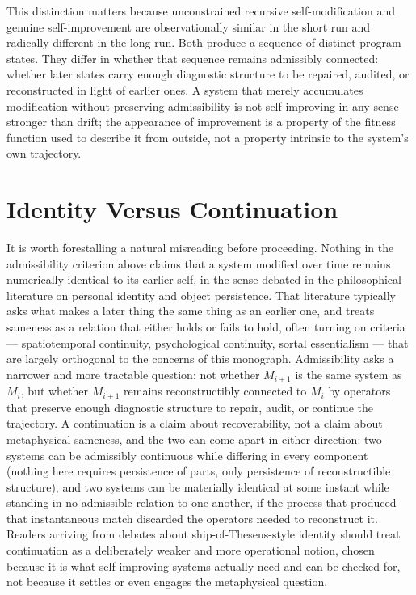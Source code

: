 \documentclass[11pt]{book}
\begin{document}
This distinction matters because unconstrained recursive self-modification and genuine self-improvement are observationally similar in the short run and radically different in the long run. Both produce a sequence of distinct program states. They differ in whether that sequence remains admissibly connected: whether later states carry enough diagnostic structure to be repaired, audited, or reconstructed in light of earlier ones. A system that merely accumulates modification without preserving admissibility is not self-improving in any sense stronger than drift; the appearance of improvement is a property of the fitness function used to describe it from outside, not a property intrinsic to the system's own trajectory.

\section{Identity Versus Continuation}

It is worth forestalling a natural misreading before proceeding. Nothing in the admissibility criterion above claims that a system modified over time remains numerically identical to its earlier self, in the sense debated in the philosophical literature on personal identity and object persistence. That literature typically asks what makes a later thing the same thing as an earlier one, and treats sameness as a relation that either holds or fails to hold, often turning on criteria --- spatiotemporal continuity, psychological continuity, sortal essentialism --- that are largely orthogonal to the concerns of this monograph. Admissibility asks a narrower and more tractable question: not whether $M_{i+1}$ is the same system as $M_i$, but whether $M_{i+1}$ remains reconstructibly connected to $M_i$ by operators that preserve enough diagnostic structure to repair, audit, or continue the trajectory. A continuation is a claim about recoverability, not a claim about metaphysical sameness, and the two can come apart in either direction: two systems can be admissibly continuous while differing in every component (nothing here requires persistence of parts, only persistence of reconstructible structure), and two systems can be materially identical at some instant while standing in no admissible relation to one another, if the process that produced that instantaneous match discarded the operators needed to reconstruct it. Readers arriving from debates about ship-of-Theseus-style identity should treat continuation as a deliberately weaker and more operational notion, chosen because it is what self-improving systems actually need and can be checked for, not because it settles or even engages the metaphysical question.
\end{document}
